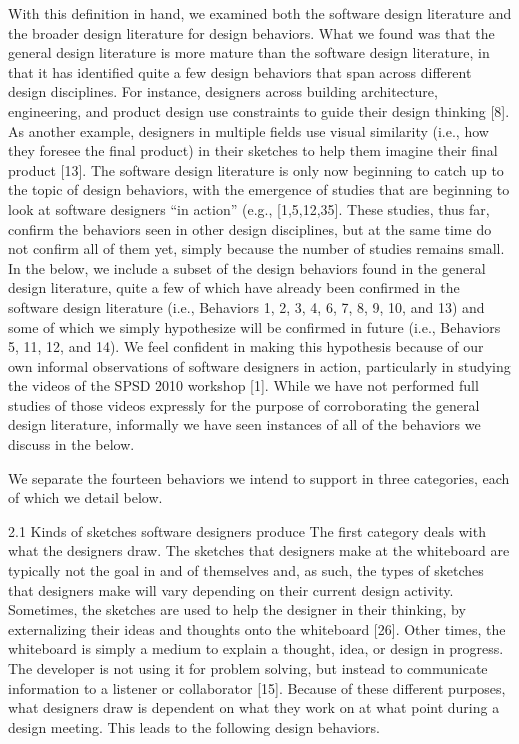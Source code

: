 With this definition in hand, we examined both the software design literature and the broader design literature for design behaviors. What we found was that the general design literature is more mature than the software design literature, in that it has identified quite a few design behaviors that span across different design disciplines. For instance, designers across building architecture, engineering, and product design use constraints to guide their design thinking [8]. As another example, designers in multiple fields use visual similarity (i.e., how they foresee the final product) in their sketches to help them imagine their final product [13].  
The software design literature is only now beginning to catch up to the topic of design behaviors, with the emergence of studies that are beginning to look at software designers “in action” (e.g., [1,5,12,35]. These studies, thus far, confirm the behaviors seen in other design disciplines, but at the same time do not confirm all of them yet, simply because the number of studies remains small. In the below, we include a subset of the design behaviors found in the general design literature, quite a few of which have already been confirmed in the software design literature (i.e., Behaviors 1, 2, 3, 4, 6, 7, 8, 9, 10, and 13) and some of which we simply hypothesize will be confirmed in future (i.e., Behaviors 5, 11, 12, and 14).  We feel confident in making this hypothesis because of our own informal observations of software designers in action, particularly in studying the videos of the SPSD 2010 workshop [1]. While we have not performed full studies of those videos expressly for the purpose of corroborating the general design literature, informally we have seen instances of all of the behaviors we discuss in the below. 

We separate the fourteen behaviors we intend to support in three categories, each of which we detail below.

2.1	Kinds of sketches software designers produce
The first category deals with what the designers draw. The sketches that designers make at the whiteboard are typically not the goal in and of themselves and, as such, the types of sketches that designers make will vary depending on their current design activity. Sometimes, the sketches are used to help the designer in their thinking, by externalizing their ideas and thoughts onto the whiteboard [26]. Other times, the whiteboard is simply a medium to explain a thought, idea, or design in progress. The developer is not using it for problem solving, but instead to communicate information to a listener or collaborator [15]. Because of these different purposes, what designers draw is dependent on what they work on at what point during a design meeting. This leads to the following design behaviors.

